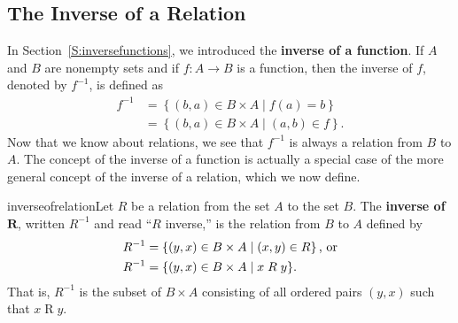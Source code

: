\subsection*{The Inverse of a Relation}
In Section~\ref{S:inversefunctions}, we introduced the \textbf{inverse of a function}.
%
%
 If  $A$ and $B$ are nonempty sets and if $f:A \to B$ is a function, then the inverse of  $f$, denoted by  $f^{ - 1} $, is defined as
\begin{align*}
f^{ - 1}  &= \left\{ { {\left( {b, a} \right) \in B \times A } \mid f\left( a \right) = b} \right\} \\
          &= \left\{ { {\left( {b, a} \right) \in B \times A } \mid \left( {a, b} \right) \in f} \right\}\!.
\end{align*}
Now that we know about relations, we see that  $f^{ - 1} $  is always a relation from  $B$  to 
$A$.  The concept of the inverse of a function is actually a special case of the more general concept of the inverse of a relation, which we now define.

\begin{defbox}{inverseofrelation}{Let  $R$  be a relation from the set  $A$  to the set  $B$.  The \textbf{inverse of}  $\boldsymbol{R}$,
%
%
 written  $R^{ - 1} $ 
\label{sym:Rinverse} and read  ``$R$  inverse,'' is the relation from  $B$  to  $A$  defined by
\[
\begin{aligned}
  R^{ - 1}  &= \left\{ { {\left( {y, x} \right) \in B \times A } \mid \left( {x, y} \right) \in R} \right\}\text{, or} \hfill \\
  R^{ - 1}  &= \left\{ { {\left( {y, x} \right) \in B \times A } \mid x \mathrel{R} y} \right\}\!. \\ 
\end{aligned} 
\]
That is, $R^{ - 1} $ is the subset of  $B \times A$ consisting of all ordered pairs  
$\left( {y, x} \right)$  such that  $x \mathrel{R} y$.}
\end{defbox}
%
